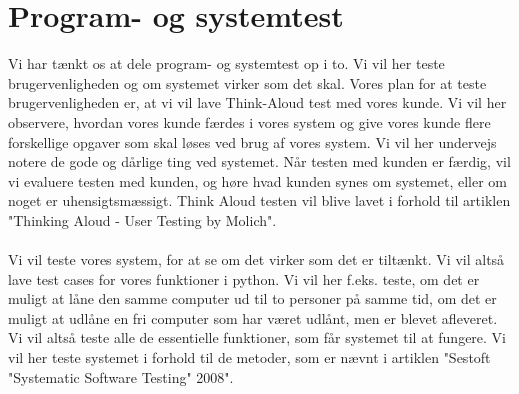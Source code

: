 \documentclass[a4paper]{article}
\begin{document}
\section{Program- og systemtest}
Vi har tænkt os at dele program- og systemtest op i to. Vi vil her teste brugervenligheden og om systemet virker som det skal. Vores plan for at teste brugervenligheden er, at vi vil lave Think-Aloud test med vores kunde. Vi vil her observere, hvordan vores kunde færdes i vores system og give vores kunde flere forskellige opgaver som skal løses ved brug af vores system. Vi vil her undervejs notere de gode og dårlige ting ved systemet. Når testen med kunden er færdig, vil vi evaluere testen med kunden, og høre hvad kunden synes om systemet, eller om noget er uhensigtsmæssigt. Think Aloud testen vil blive lavet i forhold til artiklen "Thinking Aloud - User Testing by Molich". \\ \\
Vi vil teste vores system, for at se om det virker som det er tiltænkt. Vi vil altså lave test cases for vores funktioner i python. Vi vil her f.eks. teste, om det er muligt at låne den samme computer ud til to personer på samme tid, om det er muligt at udlåne en fri computer som har været udlånt, men er blevet afleveret. Vi vil altså teste alle de essentielle funktioner, som får systemet til at fungere. Vi vil her teste systemet i forhold til de metoder, som er nævnt i artiklen "Sestoft "Systematic Software Testing" 2008".
\end{document}
